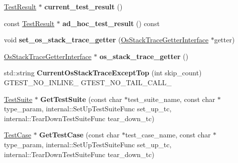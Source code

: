 \begin{DoxyCompactItemize}
\mbox{\hyperlink{classtesting_1_1TestResult}{Test\+Result}} $\ast$ {\bfseries current\+\_\+test\+\_\+result} ()
\item 
\mbox{\label{classtesting_1_1internal_1_1UnitTestImpl_a8be26dc90e0fac8f8be3552ffd98c69c}} 
const \mbox{\hyperlink{classtesting_1_1TestResult}{Test\+Result}} $\ast$ {\bfseries ad\+\_\+hoc\+\_\+test\+\_\+result} () const
\item 
\mbox{\label{classtesting_1_1internal_1_1UnitTestImpl_a3306f7d2b19bca54b841006e4a2e0260}} 
void {\bfseries set\+\_\+os\+\_\+stack\+\_\+trace\+\_\+getter} (\mbox{\hyperlink{classtesting_1_1internal_1_1OsStackTraceGetterInterface}{Os\+Stack\+Trace\+Getter\+Interface}} $\ast$getter)
\item 
\mbox{\label{classtesting_1_1internal_1_1UnitTestImpl_a71753679854f7fbba6c1568eb422fecb}} 
\mbox{\hyperlink{classtesting_1_1internal_1_1OsStackTraceGetterInterface}{Os\+Stack\+Trace\+Getter\+Interface}} $\ast$ {\bfseries os\+\_\+stack\+\_\+trace\+\_\+getter} ()
\item 
\mbox{\label{classtesting_1_1internal_1_1UnitTestImpl_a2320c999cd87f4f03db9ea4552572108}} 
std\+::string {\bfseries Current\+Os\+Stack\+Trace\+Except\+Top} (int skip\+\_\+count) G\+T\+E\+S\+T\+\_\+\+N\+O\+\_\+\+I\+N\+L\+I\+N\+E\+\_\+ G\+T\+E\+S\+T\+\_\+\+N\+O\+\_\+\+T\+A\+I\+L\+\_\+\+C\+A\+L\+L\+\_\+
\item 
\mbox{\label{classtesting_1_1internal_1_1UnitTestImpl_af816605b75754651206b2b750bb10aa9}} 
\mbox{\hyperlink{classtesting_1_1TestSuite}{Test\+Suite}} $\ast$ {\bfseries Get\+Test\+Suite} (const char $\ast$test\+\_\+suite\+\_\+name, const char $\ast$type\+\_\+param, internal\+::\+Set\+Up\+Test\+Suite\+Func set\+\_\+up\+\_\+tc, internal\+::\+Tear\+Down\+Test\+Suite\+Func tear\+\_\+down\+\_\+tc)
\item 
\mbox{\label{classtesting_1_1internal_1_1UnitTestImpl_a08bc280b795d3cfa3084c1d785da8572}} 
\mbox{\hyperlink{classtesting_1_1TestSuite}{Test\+Case}} $\ast$ {\bfseries Get\+Test\+Case} (const char $\ast$test\+\_\+case\+\_\+name, const char $\ast$type\+\_\+param, internal\+::\+Set\+Up\+Test\+Suite\+Func set\+\_\+up\+\_\+tc, internal\+::\+Tear\+Down\+Test\+Suite\+Func tear\+\_\+down\+\_\+tc)

\end{DoxyCompactItemize}
